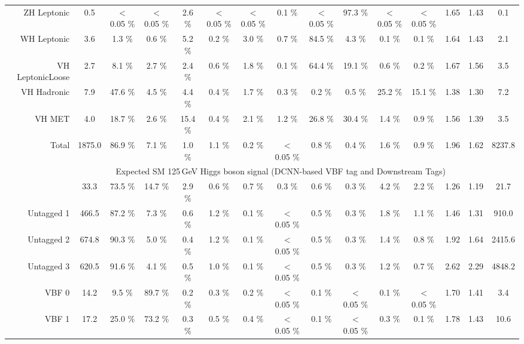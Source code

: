 \begin{landscape}
\begin{table}
{\begin{tabular}{rcccccccccccccc}
        ZH Leptonic &    0.5  &  $<$0.05 \% &  $<$0.05 \% &  2.6 \% &  $<$0.05 \% &  $<$0.05 \% &  0.1 \% &  $<$0.05 \% &  97.3 \% &  $<$0.05 \% &  $<$0.05 \%& 1.65 & 1.43 & 0.1 \\
        WH Leptonic &    3.6  &  1.3 \% &  0.6 \% &  5.2 \% &  0.2 \% &  3.0 \% &  0.7 \% &  84.5 \% &  4.3 \% &  0.1 \% &  0.1 \%& 1.64 & 1.43 & 2.1 \\
        VH LeptonicLoose &    2.7  &  8.1 \% &  2.7 \% &  2.4 \% &  0.6 \% &  1.8 \% &  0.1 \% &  64.4 \% &  19.1 \% &  0.6 \% &  0.2 \%& 1.67 & 1.56 & 3.5 \\
        \rowcolor{VHH} VH Hadronic &    7.9  &  47.6 \% &  4.5 \% &  4.4 \% &  0.4 \% &  1.7 \% &  0.3 \% &  0.2 \% &  0.5 \% &  25.2 \% &  15.1 \%& 1.38 & 1.30 & 7.2 \\
        \rowcolor{VHM} VH MET &    4.0  &  18.7 \% &  2.6 \% &  15.4 \% &  0.4 \% &  2.1 \% &  1.2 \% &  26.8 \% &  30.4 \% &  1.4 \% &  0.9 \%& 1.56 & 1.39 & 3.5 \\
        \rowcolor{Gray} Total &    1875.0  &  86.9 \% &  7.1 \% &  1.0 \% &  1.1 \% &  0.2 \% &  $<$0.05 \% &  0.8 \% &  0.4 \% &  1.6 \% &  0.9 \%& 1.96 & 1.62 & 8237.8 \\
        \hline
            \multirow{2}{*}{} &\multicolumn{13}{c}{Expected SM 125\,GeV Higgs boson signal (DCNN-based VBF tag and Downstream Tags)} & \\ \cline{2-14}
        \hline
        \rowcolor{GGH0} Untagged 0 &    33.3  &  73.5 \% &  14.7 \% &  2.9 \% &  0.6 \% &  0.7 \% &  0.3 \% &  0.6 \% &  0.3 \% &  4.2 \% &  2.2 \%& 1.26 & 1.19 &  21.7 \\
        \rowcolor{GGH1} Untagged 1 &    466.5  &  87.2 \% &  7.3 \% &  0.6 \% &  1.2 \% &  0.1 \% &  $<$0.05 \% &  0.5 \% &  0.3 \% &  1.8 \% &  1.1 \%& 1.46 & 1.31 &  910.0 \\
        \rowcolor{GGH2} Untagged 2 &    674.8  &  90.3 \% &  5.0 \% &  0.4 \% &  1.2 \% &  0.1 \% &  $<$0.05 \% &  0.5 \% &  0.3 \% &  1.4 \% &  0.8 \%& 1.92 & 1.64 &  2415.6 \\
        \rowcolor{GGH3} Untagged 3 &    620.5  &  91.6 \% &  4.1 \% &  0.5 \% &  1.0 \% &  0.1 \% &  $<$0.05 \% &  0.5 \% &  0.3 \% &  1.2 \% &  0.7 \%& 2.62 & 2.29 &  4848.2 \\
        \rowcolor{VBF0} VBF 0 &    14.2  &  9.5 \% &  89.7 \% &  0.2 \% &  0.3 \% &  0.2 \% &  $<$0.05 \% &  0.1 \% &  $<$0.05 \% &  0.1 \% &  $<$0.05 \%& 1.70 & 1.41 &  3.4 \\
        \rowcolor{VBF1} VBF 1 &    17.2  &  25.0 \% &  73.2 \% &  0.3 \% &  0.5 \% &  0.4 \% &  $<$0.05 \% &  0.1 \% &  $<$0.05 \% &  0.3 \% &  0.1 \%& 1.78 & 1.43 & 10.6 \\

\end{tabular}}
\end{table}
\end{landscape}
